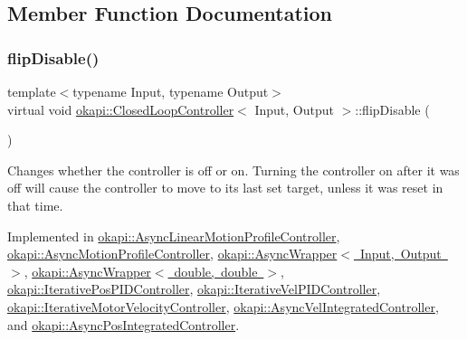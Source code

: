 \subsection{Member Function Documentation}
\mbox{\label{classokapi_1_1ClosedLoopController_a9de69b60885df41cd2164fe1a23f34d3}} 
\subsubsection{\texorpdfstring{flipDisable()}{flipDisable()}\hspace{0.1cm}{\footnotesize\ttfamily [1/2]}}
{\footnotesize\ttfamily template$<$typename Input, typename Output$>$ \\
virtual void \mbox{\hyperlink{classokapi_1_1ClosedLoopController}{okapi\+::\+Closed\+Loop\+Controller}}$<$ Input, Output $>$\+::flip\+Disable (\begin{DoxyParamCaption}{ }\end{DoxyParamCaption})\hspace{0.3cm}{\ttfamily [pure virtual]}}

Changes whether the controller is off or on. Turning the controller on after it was off will cause the controller to move to its last set target, unless it was reset in that time. 

Implemented in \mbox{\hyperlink{classokapi_1_1AsyncLinearMotionProfileController_a56b05f978f2a98c2183fdae0f13466e7}{okapi\+::\+Async\+Linear\+Motion\+Profile\+Controller}}, \mbox{\hyperlink{classokapi_1_1AsyncMotionProfileController_a7069b2b7373aec21c84369392d8d34d8}{okapi\+::\+Async\+Motion\+Profile\+Controller}}, \mbox{\hyperlink{classokapi_1_1AsyncWrapper_afdf4d80b0f3eec3d77280a561b24f0b0}{okapi\+::\+Async\+Wrapper$<$ Input, Output $>$}}, \mbox{\hyperlink{classokapi_1_1AsyncWrapper_afdf4d80b0f3eec3d77280a561b24f0b0}{okapi\+::\+Async\+Wrapper$<$ double, double $>$}}, \mbox{\hyperlink{classokapi_1_1IterativePosPIDController_a8f7e1c7bc45f6b9df7a24edb60fc9e6a}{okapi\+::\+Iterative\+Pos\+P\+I\+D\+Controller}}, \mbox{\hyperlink{classokapi_1_1IterativeVelPIDController_a9a575df2d0a53ca71a812a86d673b8fa}{okapi\+::\+Iterative\+Vel\+P\+I\+D\+Controller}}, \mbox{\hyperlink{classokapi_1_1IterativeMotorVelocityController_a24d2200fe82b8f454839caaa511483f6}{okapi\+::\+Iterative\+Motor\+Velocity\+Controller}}, \mbox{\hyperlink{classokapi_1_1AsyncVelIntegratedController_ab75c1617544e0817949df5998fa2a8d7}{okapi\+::\+Async\+Vel\+Integrated\+Controller}}, and \mbox{\hyperlink{classokapi_1_1AsyncPosIntegratedController_a95c0b1350a2287e72d6517acdb8082b1}{okapi\+::\+Async\+Pos\+Integrated\+Controller}}.


